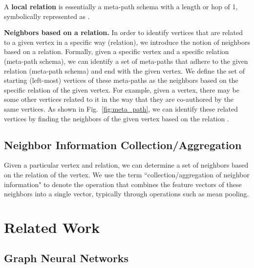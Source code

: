 \documentclass[lettersize,journal]{IEEEtran}
\begin{document}
A \textbf{local relation} is essentially a meta-path schema with a length or hop of 1, symbolically represented as .


\textbf{Neighbors based on a relation.}
In order to identify vertices that are related to a given vertex in a specific way (relation), we introduce the notion of neighbors based on a relation.
Formally, given a specific vertex and a specific relation (meta-path schema), we can identify a set of meta-paths that adhere to the given relation (meta-path schema) and end with the given vertex. 
We define the set of starting (left-most) vertices of these meta-paths as the neighbors based on the specific relation of the given vertex.
For example, given a  vertex, there may be some other  vertices related to it in the way that they are co-authored by the same  vertices.
As shown in Fig.~\ref{fig:meta_path}, we can identify these related  vertices by finding the neighbors of the given  vertex based on the relation .


\subsection{Neighbor Information Collection/Aggregation}
Given a particular vertex and relation, we can determine a set of neighbors based on the relation of the vertex.
We use the term ``collection/aggregation of neighbor information" to denote the operation that combines the feature vectors of these neighbors into a single vector, typically through operations such as mean pooling.









  
\section{Related Work}

\subsection{Graph Neural Networks}
\end{document}
